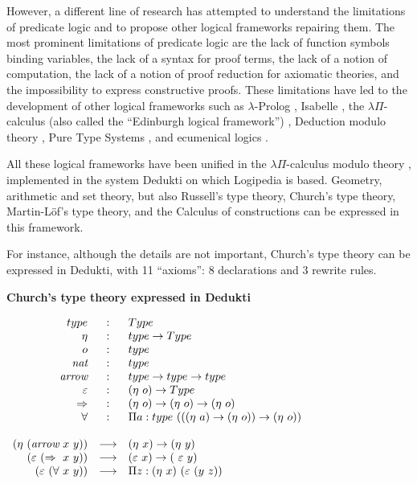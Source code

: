 However, a different line of research has attempted to understand the
limitations of predicate logic and to propose other logical frameworks
repairing them. The most prominent limitations of predicate logic are
the lack of function symbols binding variables, the lack of a syntax
for proof terms, the lack of a notion of computation, the lack of a
notion of proof reduction for axiomatic theories, and the
impossibility to express constructive proofs. These limitations have
led to the development of other logical frameworks such as
$\lambda$-Prolog \cite{NadathurMiller88, MillerNadathur12}, Isabelle
\cite{Paulson90}, the $\lambda \Pi$-calculus (also called the
``Edinburgh logical framework'') \cite{HarperHonsellPlotkin91},
Deduction modulo theory \cite{DowekHardinKirchner03, DowekWerner03},
Pure Type Systems \cite{Berardi88,Terlouw89}, and ecumenical logics
\cite{Prawitz15,Dowek15,PereiraRodriguez17}.

All these logical frameworks have been unified in the $\lambda
\Pi$-calculus modulo theory \cite{CousineauDowek07}, implemented in
the system Dedukti \cite{Assaf16} on which Logipedia is
based. Geometry, arithmetic and set theory, but also Russell's type
theory, Church's type theory, Martin-L\"of's type theory, and the
Calculus of constructions can be expressed in this framework.

For instance, although the details are not important, Church's type
theory can be expressed in Dedukti, with 11 ``axioms'': 8 declarations
and 3 rewrite rules.

\begin{framed}
\begin{center}
{\bf \Large Church's type theory expressed in Dedukti}
\end{center}

$\begin{array}{rcl}
type&:&Type\\
\eta&:&type \rightarrow Type\\
o&:&type\\
\mbox{\it nat}&:&type\\
\mbox{\it arrow}&:&type \rightarrow type \rightarrow type\\
\varepsilon&:&(\eta~o) \rightarrow Type\\
\Rightarrow&:&(\eta~o) \rightarrow (\eta~o) \rightarrow (\eta~o)\\
\forall&:&\Pi a:type~(((\eta~a) \rightarrow (\eta~o)) \rightarrow (\eta~o))\\
\\
(\eta~(\mbox{\it arrow}~x~y)) &\longrightarrow& (\eta~x) \rightarrow (\eta~y)\\
(\varepsilon~(\Rightarrow~x~y)) &\longrightarrow& (\varepsilon~x) \rightarrow (\
\varepsilon~y)\\
(\varepsilon~(\forall~x~y)) &\longrightarrow& \Pi z:(\eta~x)~(\varepsilon~(y~z))
\end{array}$
\end{framed}

